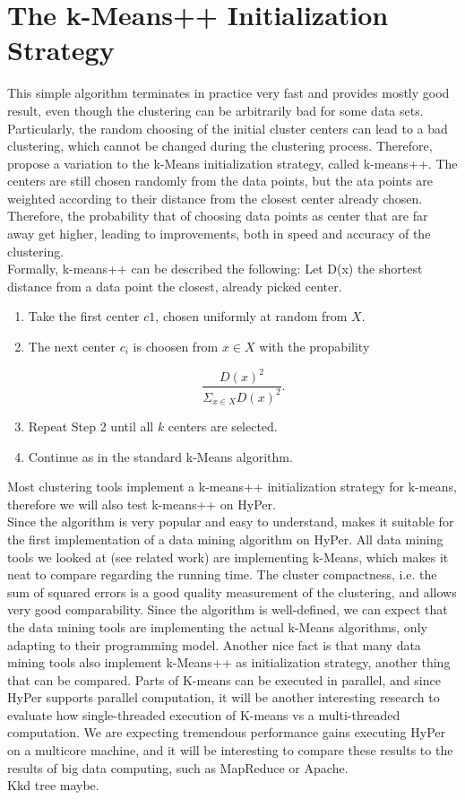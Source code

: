 \section{The k-Means++ Initialization Strategy}

This simple algorithm terminates in practice very fast and provides mostly good result, even though the clustering can be arbitrarily bad for some data sets. Particularly, the random choosing of the initial cluster centers can lead to a bad clustering, which cannot be changed during the clustering process. Therefore,  propose a variation to the k-Means initialization strategy, called k-means++. The centers are still chosen randomly from the data points, but the ata points are weighted according to their distance from the closest center already chosen. Therefore, the probability that of choosing data points as center that are far away get higher, leading to improvements, both in speed and accuracy of the clustering.
\\
Formally, k-means++ can be described the following:
Let D(x) the shortest distance from a data point the closest, already picked center. 

\begin{enumerate} 
\item Take the first center $c1$, chosen uniformly at random from $X$.
\item The next center $c_i$ is choosen from $x \in X$ with the propability 

\begin{equation*}
\frac {D(x)^2} {\Sigma_{x \in X} D(x)^2}.
\end{equation*}

\item Repeat Step 2 until all $k$ centers are selected.
\item Continue as in the standard k-Means algorithm.
\end{enumerate}

Most clustering tools implement a k-means++ initialization strategy for k-means, therefore we will also test k-means++ on HyPer.
\\
Since the algorithm is very popular and easy to understand, makes it suitable for the first implementation of a data mining algorithm on HyPer. All data mining tools we looked at (see related work) are implementing k-Means, which makes it neat to compare regarding the running time. The cluster compactness, i.e. the sum of squared errors is a good quality measurement of the clustering, and allows very good comparability. Since the algorithm is well-defined, we can expect that the data mining tools are implementing the actual k-Means algorithms, only adapting to their programming model. Another nice fact is that many data mining tools also implement k-Means++ as initialization strategy, another thing that can be compared.
Parts of K-means can be executed in parallel, and since HyPer supports parallel computation, it will be another interesting research to evaluate how single-threaded execution of K-means vs a multi-threaded computation. We are expecting tremendous performance gains executing HyPer on a multicore machine, and it will be interesting to compare these results to the results of big data computing, such as MapReduce or Apache.
\\ 
Kkd tree maybe.
